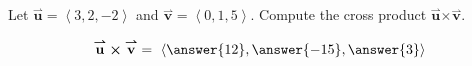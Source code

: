 \documentclass{ximera}
\author{Gregory Hartman \and Matthew Carr}
\begin{document}
\begin{exercise}
Let $\overset{\boldsymbol{\rightharpoonup}}{\mathbf{u}} = \left< 3,2,-2 \right>$ and $\overset{\boldsymbol{\rightharpoonup}}{\mathbf{v}} = \left< 0,1,5 \right>$. Compute the cross product $\overset{\boldsymbol{\rightharpoonup}}{\mathbf{u}} \boldsymbol\times \overset{\boldsymbol{\rightharpoonup}}{\mathbf{v}}$.

\begin{prompt}
\[
\overset{\boldsymbol{\rightharpoonup}}{\mathbf{u}} \boldsymbol\times \overset{\boldsymbol{\rightharpoonup}}{\mathbf{v}} =\ \left< \answer{12},\answer{-15},\answer{3} \right>
\]
\end{prompt}


\end{exercise}
\end{document}
